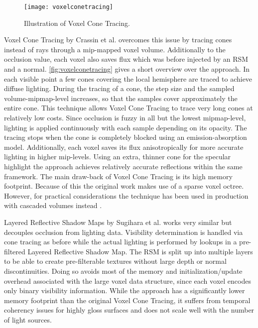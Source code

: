 \documentclass[thesis.tex]{subfiles}
\begin{document}
\begin{figure}[h]
\centering
 \texttt{[image: voxelconetracing]}
\caption{\cite{bib:voxelconetracing} Illustration of Voxel Cone Tracing. } \label{fig:voxelconetracing}
\end{figure}
Voxel Cone Tracing by Crassin et al. \cite{bib:voxelconetracing} overcomes this issue by tracing cones instead of rays through a mip-mapped voxel volume.
Additionally to the occlusion value, each voxel also saves flux which was before injected by an RSM and a normal.
\autoref{fig:voxelconetracing} gives a short overview over the approach.
In each visible point a few cones covering the local hemisphere are traced to achieve diffuse lighting.
During the tracing of a cone, the step size and the sampled volume-mipmap-level increases, so that the samples cover approximately the entire cone.
This technique allows Voxel Cone Tracing to trace very long cones at relatively low costs.
Since occlusion is fuzzy in all but the lowest mipmap-level, lighting is applied continuously with each sample depending on its opacity.
The tracing stops when the cone is completely blocked using an emission-absorption model.
Additionally, each voxel saves its flux anisotropically for more accurate lighting in higher mip-levels.
Using an extra, thinner cone for the specular highlight the approach achieves relatively accurate reflections within the same framework.
The main draw-back of Voxel Cone Tracing is its high memory footprint.
Because of this the original work makes use of a sparse voxel octree.
However, for practical considerations the technique has been used in production with cascaded volumes instead \cite{bib:fumufu:vct}.

Layered Reflective Shadow Maps by Sugihara et al. \cite{bib:layeredrsm} works very similar but decouples occlusion from lighting data.
Visibility determination is handled via cone tracing as before while the actual lighting is performed by lookups in a pre-filtered Layered Reflective Shadow Map.
The RSM is split up into multiple layers to be able to create pre-filterable textures without large depth or normal discontinuities.
Doing so avoids most of the memory and initialization/update overhead associated with the large voxel data structure, since each voxel encodes only binary visibility information.
While the approach has a significantly lower memory footprint than the original Voxel Cone Tracing, it suffers from temporal coherency issues for highly gloss surfaces and does not scale well with the number of light sources.
\end{document}
